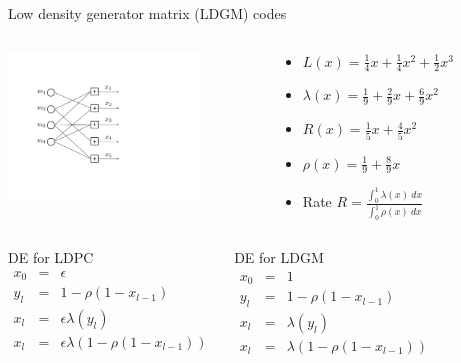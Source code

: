 \begin{frame}{Low density generator matrix (LDGM) codes}
\vspace{-3mm}
\begin{columns}
\begin{column}{0.47\textwidth}
\begin{center}
\includegraphics[width=2.0in]{./Figures/LDGM}
\end{center}
\end{column}
\begin{column}{0.47\textwidth}
\begin{itemize}
\item $L(x) = \frac14 x + \frac14 x^2 + \frac12 x^3$
\vspace{2mm}
\item $\lambda(x) = \frac19 + \frac29 x + \frac 69 x^2$
\vspace{2mm}
\item $R(x) = \frac15 x + \frac45 x^2$
\vspace{2mm}
\item $\rho(x) = \frac19 + \frac89 x$
\vspace{2mm}
\item Rate $R = \frac{\int_{0}^{1}\lambda(x) \ dx}{\int_{0}^{1} \rho(x) \ dx}$
\end{itemize}
\end{column}
\end{columns}

\begin{columns}
\begin{block}{DE for LDPC}
\vspace*{-3mm}
\begin{eqnarray*}
  x_0 &=& \epsilon \\
  y_l &=& 1-\rho(1-x_{l-1}) \\
  x_l &=& \epsilon \lambda(y_l)\\
  x_l &=& \epsilon \lambda(1-\rho(1-x_{l-1}))
\end{eqnarray*}
\end{block}

\begin{block}{DE for LDGM}
\vspace*{-3mm}
\begin{eqnarray*}
  x_0 &=& 1 \\
  y_l &=& 1-\rho(1-x_{l-1}) \\
  x_l &=& \lambda(y_l) \\
  x_l &=& \lambda(1-\rho(1-x_{l-1}))
\end{eqnarray*}
\end{block}
\end{columns}
\end{frame}
